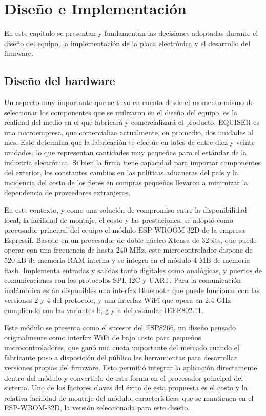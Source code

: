 \chapter{Diseño e Implementación} %
\label{Chapter3} 

En este capitulo se presentan y fundamentan las decisiones adoptadas durante el diseño del equipo, la implementación de la placa electrónica y el desarrollo del firmware.

\section{Diseño del hardware}
\label{sec:hardware}

Un aspecto muy importante que se tuvo en cuenta desde el momento mismo de seleccionar los componentes que se utilizaron en el diseño del equipo, es la realidad del medio en el que fabricará y comercializará el producto. EQUISER es una microempresa, que comercializa actualmente, en promedio, dos unidades al mes. Esto determina que la fabricación se efectúe en lotes de entre diez y veinte unidades, lo que representan cantidades muy pequeñas para el estándar de la industria electrónica. Si bien la firma tiene capacidad para importar componentes del exterior, los constantes cambios en las políticas aduaneras del país y la incidencia del costo de los fletes en compras pequeñas llevaron a  minimizar la dependencia de proveedores extranjeros.

En este contexto, y como una solución de compromiso entre la disponibilidad local, la facilidad de montaje, el costo y las prestaciones, se adoptó como procesador principal del equipo el módulo ESP-WROOM-32D de la empresa Espressif. Basado en un procesador de doble núcleo Xtensa de 32bits, que puede operar con una frecuencia de hasta 240 MHz, este microcontrolador dispone de 520 kB de memoria RAM interna y se integra en el módulo 4 MB de memoria flash. Implementa entradas y salidas tanto digitales como analógicas, y puertos de comunicaciones con los protocolos SPI, I2C y UART. Para la comunicación inalámbrica están disponibles una interfaz Bluetooth que puede funcionar con las versiones 2 y 4 del protocolo, y una interfaz WiFi que opera en 2.4 GHz cumpliendo con las variantes b, g y n del estándar IEEE802.11.

Este módulo se presenta como el sucesor del ESP8266, un diseño pensado originalmente como interfaz WiFi de bajo costo para pequeños microcontroladores, que ganó una cuota importante del mercado cuando el fabricante puso a disposición del público las herramientas para desarrollar versiones propias del firmware. Esto permitió integrar la aplicación directamente dentro del módulo y convertirlo de esta forma en el procesador principal del sistema. Uno de los factores claves del éxito de esta propuesta es el costo y la relativa facilidad de montaje del módulo, características que se mantienen en el ESP-WROM-32D, la versión seleccionada para este diseño. 

